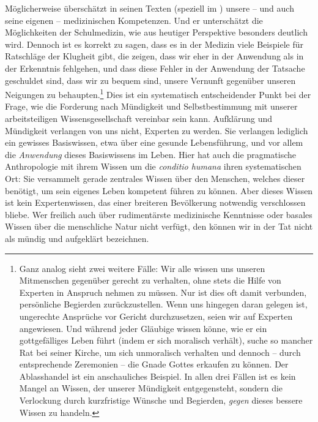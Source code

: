 Möglicherweise überschätzt  in seinen Texten (speziell im
) unsere -- und auch seine eigenen -- medizinischen
Kompetenzen. Und er unterschätzt die Möglichkeiten der Schulmedizin, wie aus
heutiger Perspektive besonders deutlich wird. Dennoch ist es korrekt zu sagen,
dass es in der Medizin viele Beispiele für Ratschläge der Klugheit gibt, die
zeigen, dass wir eher in der Anwendung als in der Erkenntnis fehlgehen, und dass
diese Fehler in der Anwendung der Tatsache geschuldet sind, dass wir zu bequem
sind, unsere Vernunft gegenüber unseren Neigungen zu
behaupten.\footnote{Ganz analog
sieht  zwei weitere Fälle: Wir alle wissen uns unseren
Mitmenschen gegenüber gerecht zu verhalten, ohne stets die Hilfe von Experten in
Anspruch nehmen zu müssen. Nur ist dies oft damit verbunden, persönliche
Begierden zurückzustellen. Wenn uns hingegen daran gelegen ist, ungerechte
Ansprüche vor Gericht durchzusetzen, seien wir auf Experten angewiesen. Und
während jeder Gläubige wissen könne, wie er ein gottgefälliges Leben führt
(indem er sich moralisch verhält), suche so mancher Rat bei seiner Kirche, um
sich unmoralisch verhalten und dennoch -- durch entsprechende Zeremonien -- die
Gnade Gottes erkaufen zu können. Der Ablasshandel ist ein anschauliches
Beispiel. In allen drei Fällen ist es kein Mangel an Wissen, der unserer
Mündigkeit entgegensteht, sondern die Verlockung durch kurzfristige Wünsche
und Begierden, \emph{gegen} dieses bessere Wissen zu handeln.}
Dies ist ein systematisch entscheidender Punkt bei der Frage, wie die Forderung
nach Mündigkeit und Selbstbestimmung mit unserer arbeitsteiligen
Wissensgesellschaft vereinbar sein kann. Aufklärung und Mündigkeit verlangen von
uns nicht, Experten zu werden. Sie verlangen lediglich ein gewisses Basiswissen,
etwa über eine gesunde Lebensführung, und vor allem die \emph{Anwendung} dieses
Basiswissens im Leben. Hier hat auch die pragmatische Anthropologie mit ihrem
Wissen um die \emph{conditio humana} ihren systematischen Ort: Sie versammelt
gerade zentrales Wissen über den Menschen, welches dieser benötigt, um sein
eigenes Leben kompetent führen zu können. Aber dieses Wissen ist kein
Expertenwissen, das einer breiteren Bevölkerung notwendig verschlossen bliebe.
Wer freilich auch über rudimentärste medizinische Kenntnisse oder basales Wissen
über die menschliche Natur nicht verfügt, den können wir in der Tat nicht als
mündig und aufgeklärt bezeichnen.

